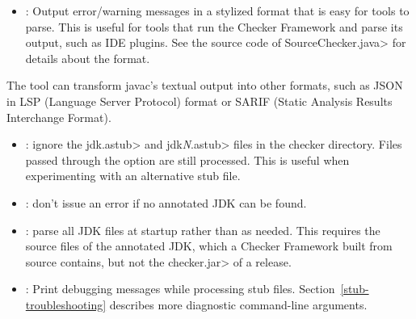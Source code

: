 
\begin{itemize}

\item {}: Output error/warning messages in a
  stylized format that is easy for tools to parse.  This is useful for
  tools that run the Checker Framework and parse its output, such as IDE
  plugins.  See the source code of \<SourceChecker.java> for details about
  the format.

\end{itemize}

The
tool can transform javac's textual output into other formats, such as JSON
in LSP (Language Server Protocol) format or SARIF (Static Analysis Results
Interchange Format).



\begin{itemize}

\item {}:
  ignore the \<jdk.astub> and \<jdk\emph{N}.astub> files in the checker directory. Files passed
  through the  option are still processed. This is useful
  when experimenting with an alternative stub file.

\item {}:
  don't issue an error if no annotated JDK can be found.

\item {}:
  parse all JDK files at startup rather than as needed.  This requires the
  source files of the annotated JDK, which a Checker Framework built from
  source contains, but not the \<checker.jar> of a release.

\item {}:
  Print debugging messages while processing stub files.
  Section~\ref{stub-troubleshooting} describes more diagnostic command-line
  arguments.

\end{itemize}


